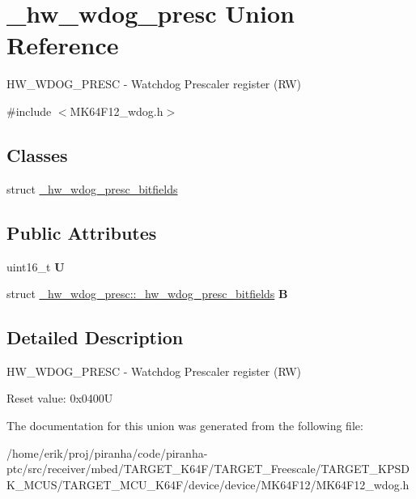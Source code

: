\hypertarget{union__hw__wdog__presc}{}\section{\+\_\+hw\+\_\+wdog\+\_\+presc Union Reference}
\label{union__hw__wdog__presc}


H\+W\+\_\+\+W\+D\+O\+G\+\_\+\+P\+R\+E\+SC -\/ Watchdog Prescaler register (RW)  




{\ttfamily \#include $<$M\+K64\+F12\+\_\+wdog.\+h$>$}

\subsection*{Classes}
\begin{DoxyCompactItemize}
\item 
struct \hyperlink{struct__hw__wdog__presc_1_1__hw__wdog__presc__bitfields}{\+\_\+hw\+\_\+wdog\+\_\+presc\+\_\+bitfields}
\end{DoxyCompactItemize}
\subsection*{Public Attributes}
\begin{DoxyCompactItemize}
\item 
uint16\+\_\+t {\bfseries U}\hypertarget{union__hw__wdog__presc_a86fb961bd1ee7732f962ad3a41726f2c}{}\label{union__hw__wdog__presc_a86fb961bd1ee7732f962ad3a41726f2c}

\item 
struct \hyperlink{struct__hw__wdog__presc_1_1__hw__wdog__presc__bitfields}{\+\_\+hw\+\_\+wdog\+\_\+presc\+::\+\_\+hw\+\_\+wdog\+\_\+presc\+\_\+bitfields} {\bfseries B}\hypertarget{union__hw__wdog__presc_ad3dbb5f804347a5fd6ef495c42df9a18}{}\label{union__hw__wdog__presc_ad3dbb5f804347a5fd6ef495c42df9a18}

\end{DoxyCompactItemize}


\subsection{Detailed Description}
H\+W\+\_\+\+W\+D\+O\+G\+\_\+\+P\+R\+E\+SC -\/ Watchdog Prescaler register (RW) 

Reset value\+: 0x0400U 

The documentation for this union was generated from the following file\+:\begin{DoxyCompactItemize}
\item 
/home/erik/proj/piranha/code/piranha-\/ptc/src/receiver/mbed/\+T\+A\+R\+G\+E\+T\+\_\+\+K64\+F/\+T\+A\+R\+G\+E\+T\+\_\+\+Freescale/\+T\+A\+R\+G\+E\+T\+\_\+\+K\+P\+S\+D\+K\+\_\+\+M\+C\+U\+S/\+T\+A\+R\+G\+E\+T\+\_\+\+M\+C\+U\+\_\+\+K64\+F/device/device/\+M\+K64\+F12/M\+K64\+F12\+\_\+wdog.\+h\end{DoxyCompactItemize}
